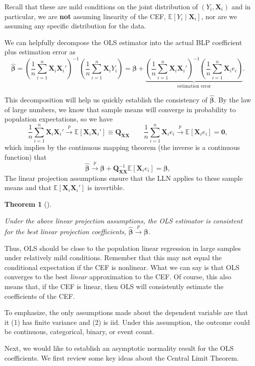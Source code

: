 \documentclass[
  13pt,
  letterpaper,
  DIV=11,
  numbers=noendperiod]{scrreprt}
\newcommand{\mb}{\symbf}
\newcommand{\E}{\mathbb{E}}
\newcommand{\X}{\mb{X}}
\newcommand{\bfbeta}{\mb{\beta}}
\newcommand{\bhat}{\widehat{\mb{\beta}}}
\newcommand{\inprob}{\overset{p}{\to}}
\theoremstyle{plain}
\newtheorem{theorem}{Theorem}[chapter]
\theoremstyle{definition}
\theoremstyle{definition}
\theoremstyle{remark}
\begin{document}
Recall that these are mild conditions on the joint distribution of
\((Y_{i}, \X_{i})\) and in particular, we are \textbf{not} assuming
linearity of the CEF, \(\E[Y_{i} \mid \X_{i}]\), nor are we assuming any
specific distribution for the data.

We can helpfully decompose the OLS estimator into the actual BLP
coefficient plus estimation error as \[ 
\bhat = \left( \frac{1}{n} \sum_{i=1}^n \X_i\X_i' \right)^{-1} \left( \frac{1}{n} \sum_{i=1}^n \X_iY_i \right) = \bfbeta + \underbrace{\left( \frac{1}{n} \sum_{i=1}^n \X_i\X_i' \right)^{-1} \left( \frac{1}{n} \sum_{i=1}^n \X_ie_i \right)}_{\text{estimation error}}.
\]

This decomposition will help us quickly establish the consistency of
\(\bhat\). By the law of large numbers, we know that sample means will
converge in probability to population expectations, so we have \[ 
\frac{1}{n} \sum_{i=1}^n \X_i\X_i' \inprob \E[\X_i\X_i'] \equiv \mb{Q}_{\X\X} \qquad \frac{1}{n} \sum_{i=1}^n \X_ie_i \inprob \E[\X_{i} e_{i}] = \mb{0},
\] which implies by the continuous mapping theorem (the inverse is a
continuous function) that \[
\bhat \inprob \bfbeta + \mb{Q}_{\X\X}^{-1}\E[\X_ie_i] = \bfbeta,
\] The linear projection assumptions ensure that the LLN applies to
these sample means and that \(\E[\X_{i}\X_{i}']\) is invertible.

\begin{theorem}[]\protect\hypertarget{thm-ols-consistency}{}\label{thm-ols-consistency}

Under the above linear projection assumptions, the OLS estimator is
consistent for the best linear projection coefficients,
\(\bhat \inprob \bfbeta\).

\end{theorem}

Thus, OLS should be close to the population linear regression in large
samples under relatively mild conditions. Remember that this may not
equal the conditional expectation if the CEF is nonlinear. What we can
say is that OLS converges to the best \emph{linear} approximation to the
CEF. Of course, this also means that, if the CEF is linear, then OLS
will consistently estimate the coefficients of the CEF.

To emphasize, the only assumptions made about the dependent variable are
that it (1) has finite variance and (2) is iid. Under this assumption,
the outcome could be continuous, categorical, binary, or event count.

Next, we would like to establish an asymptotic normality result for the
OLS coefficients. We first review some key ideas about the Central Limit
Theorem.
\end{document}
